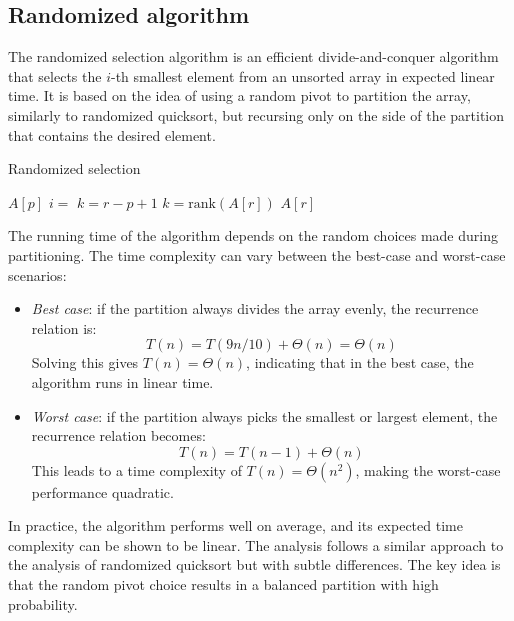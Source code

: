 \subsection{Randomized algorithm}
The randomized selection algorithm is an efficient divide-and-conquer algorithm that selects the $i$-th smallest element from an unsorted array in expected linear time. 
It is based on the idea of using a random pivot to partition the array, similarly to randomized quicksort, but recursing only on the side of the partition that contains the desired element.
\begin{algorithm}[H]
    \caption{Randomized selection}
    \begin{algorithmic}[1]
                    \State \Return $A[p]$ 
                \EndIf 
                \State $i= $ 
                \State $k=r-p+1$ \Comment $k=\text{rank}(A[r])$ 
                    \State \Return $A[r]$   
                \EndIf 
                    \State \Return {}
                \Else 
                    \State \Return {}
                \EndIf 
            \EndFunction
    \end{algorithmic}
\end{algorithm}  
The running time of the algorithm depends on the random choices made during partitioning. 
The time complexity can vary between the best-case and worst-case scenarios:
\begin{itemize}
    \item \textit{Best case}: if the partition always divides the array evenly, the recurrence relation is: 
        \[T(n) = T(9n/10) + \Theta(n)= \Theta(n)\]
        Solving this gives $T(n)=\Theta(n)$, indicating that in the best case, the algorithm runs in linear time.
    \item \textit{Worst case}: if the partition always picks the smallest or largest element, the recurrence relation becomes:
        \[T(n)=T(n-1)+\Theta(n)\]
        This leads to a time complexity of $T(n)=\Theta(n^2)$, making the worst-case performance quadratic.
\end{itemize}
In practice, the algorithm performs well on average, and its expected time complexity can be shown to be linear. 
The analysis follows a similar approach to the analysis of randomized quicksort but with subtle differences. 
The key idea is that the random pivot choice results in a balanced partition with high probability.

